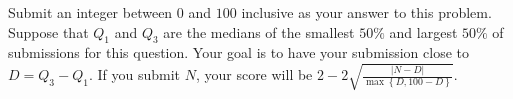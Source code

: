 Submit an integer between $0$ and $100$ inclusive as your answer to this problem. Suppose that $Q_1$ and $Q_3$ are the medians of the smallest $50\%$ and largest $50\%$ of submissions for this question. Your goal is to have your submission close to $D=Q_3-Q_1$. If you submit $N$, your score will be $2-2\sqrt{\frac{\left|N-D\right|}{\max\left\{D,100-D\right\}}}$.